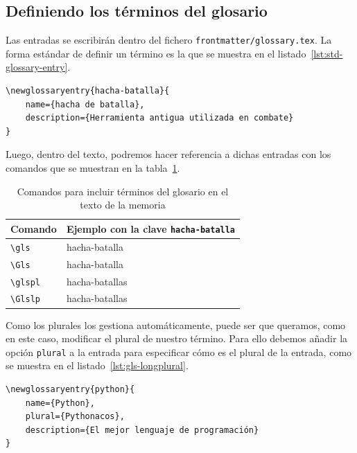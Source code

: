 \documentclass[%
    school=etsisi,%
    degree=61TI,%
]{upm-report}
\begin{document}
\subsection{Definiendo los términos del glosario}

Las entradas se escribirán dentro del fichero \texttt{frontmatter/glossary.tex}. La forma estándar de definir un término es la que se muestra en el listado~\ref{lst:std-glossary-entry}.

\begin{lstlisting}[language={[latex]TeX},caption=Código para crear una entrada en el glosario,label=lst:std-glossary-entry]
\newglossaryentry{hacha-batalla}{
    name={hacha de batalla},
    description={Herramienta antigua utilizada en combate}
}
\end{lstlisting}

Luego, dentro del texto, podremos hacer referencia a dichas entradas con los comandos que se muestran en la tabla~\ref{tab:glossary-commands}.

\begin{table}
    \caption{\label{tab:glossary-commands}Comandos para incluir términos del glosario en el texto de la memoria}
    \begin{tabularx}{\textwidth}{@{}lX@{}}
        \toprule
        \textbf{Comando} & \textbf{Ejemplo con la clave \texttt{hacha-batalla}} \\
        \midrule
        \texttt{\textbackslash gls} & \gls{hacha-batalla} \\
        \texttt{\textbackslash Gls} & \Gls{hacha-batalla} \\
        \texttt{\textbackslash glspl} & \glspl{hacha-batalla} \\
        \texttt{\textbackslash Glslp} & \Glspl{hacha-batalla} \\
        \bottomrule
    \end{tabularx}
\end{table}

Como los plurales los gestiona automáticamente, puede ser que queramos, como en este caso, modificar el plural de nuestro término. Para ello debemos añadir la opción \texttt{plural} a la entrada para especificar cómo es el plural de la entrada, como se muestra en el listado~\ref{lst:gls-longplural}.

\begin{lstlisting}[language={[latex]TeX},caption=Especificando el plural para un término del glosario,label=lst:gls-longplural]
\newglossaryentry{python}{
    name={Python},
    plural={Pythonacos},
    description={El mejor lenguaje de programación}
}
\end{lstlisting}
\end{document}
